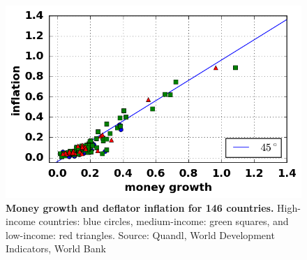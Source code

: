 \begin{figure}[h]
\caption{\label{fig:money_inflation_open} \textbf{Money growth and deflator inflation for 146 countries.} High-income countries: blue circles, medium-income: green squares, and low-income: red triangles. {\tiny Source: Quandl, World Development Indicators, World Bank}}
\hspace*{-.5cm}\includegraphics[height = 7.cm]{./png/fig_money_inflation_open.png}
\end{figure}